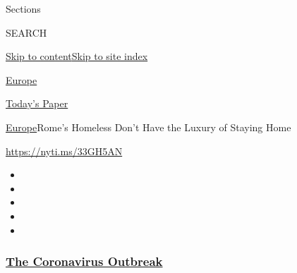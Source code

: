 Sections

SEARCH

\protect\hyperlink{site-content}{Skip to
content}\protect\hyperlink{site-index}{Skip to site index}

\href{https://www.nytimes3xbfgragh.onion/section/world/europe}{Europe}

\href{https://myaccount.nytimes3xbfgragh.onion/auth/login?response_type=cookie\&client_id=vi}{}

\href{https://www.nytimes3xbfgragh.onion/section/todayspaper}{Today's
Paper}

\href{/section/world/europe}{Europe}\textbar{}Rome's Homeless Don't Have
the Luxury of Staying Home

\url{https://nyti.ms/33GH5AN}

\begin{itemize}
\item
\item
\item
\item
\item
\end{itemize}

\hypertarget{the-coronavirus-outbreak}{%
\subsubsection{\texorpdfstring{\href{https://www.nytimes3xbfgragh.onion/news-event/coronavirus?name=styln-coronavirus-national\&region=TOP_BANNER\&block=storyline_menu_recirc\&action=click\&pgtype=Article\&impression_id=c37b67c0-f2d2-11ea-b68a-41a1aa20deb5\&variant=undefined}{The
Coronavirus
Outbreak}}{The Coronavirus Outbreak}}\label{the-coronavirus-outbreak}}

